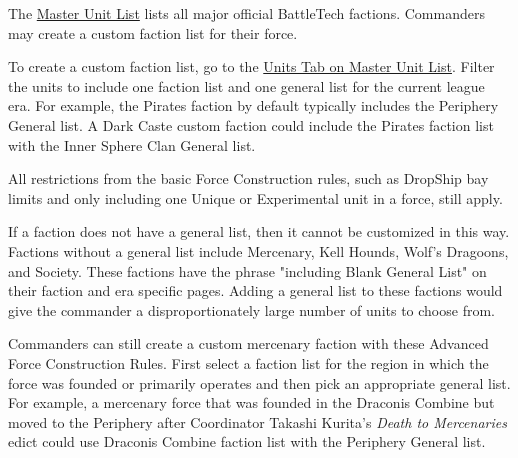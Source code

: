 The \href{http://www.masterunitlist.info/}{Master Unit List} lists all major official BattleTech factions.
Commanders may create a custom faction list for their force.

To create a custom faction list, go to the \href{http://www.masterunitlist.info/Unit/Filter}{Units Tab on Master Unit List}.
Filter the units to include one faction list and one general list for the current league era.
For example, the Pirates faction by default typically includes the Periphery General list.
A Dark Caste custom faction could include the Pirates faction list with the Inner Sphere Clan General list.

All restrictions from the basic Force Construction rules, such as DropShip bay limits and only including one Unique or Experimental unit in a force, still apply.

If a faction does not have a general list, then it cannot be customized in this way.
Factions without a general list include Mercenary, Kell Hounds, Wolf's Dragoons, and Society.
These factions have the phrase "including Blank General List" on their faction and era specific pages.
Adding a general list to these factions would give the commander a disproportionately large number of units to choose from.

Commanders can still create a custom mercenary faction with these Advanced Force Construction Rules.
First select a faction list for the region in which the force was founded or primarily operates and then pick an appropriate general list.
For example, a mercenary force that was founded in the Draconis Combine but moved to the Periphery after Coordinator Takashi Kurita's \emph{Death to Mercenaries} edict could use Draconis Combine faction list with the Periphery General list.

